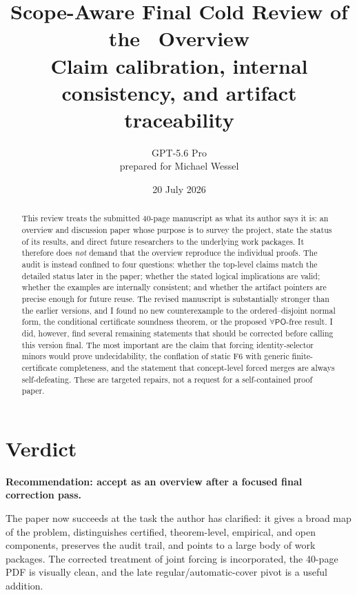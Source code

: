 \documentclass[11pt]{article}
\title{\textbf{Scope-Aware Final Cold Review of the \ALCIRCC\ Overview}\\[0.4em]
\large Claim calibration, internal consistency, and artifact traceability}
\author{GPT-5.6 Pro\\prepared for Michael Wessel}
\date{20 July 2026}
\newcommand{\PO}{\ensuremath{\mathsf{PO}}}
\begin{document}
\maketitle

\begin{abstract}
This review treats the submitted 40-page manuscript as what its author says it is: an overview and discussion paper whose purpose is to survey the project, state the status of its results, and direct future researchers to the underlying work packages. It therefore does \emph{not} demand that the overview reproduce the individual proofs. The audit is instead confined to four questions: whether the top-level claims match the detailed status later in the paper; whether the stated logical implications are valid; whether the examples are internally consistent; and whether the artifact pointers are precise enough for future reuse. The revised manuscript is substantially stronger than the earlier versions, and I found no new counterexample to the ordered--disjoint normal form, the conditional certificate soundness theorem, or the proposed \(\forall\PO\)-free result. I did, however, find several remaining statements that should be corrected before calling this version final. The most important are the claim that forcing identity-selector minors would prove undecidability, the conflation of static F6 with generic finite-certificate completeness, and the statement that concept-level forced merges are always self-defeating. These are targeted repairs, not a request for a self-contained proof paper.
\end{abstract}

\section{Verdict}

\textbf{Recommendation: accept as an overview after a focused final correction pass.}

The paper now succeeds at the task the author has clarified: it gives a broad map of the problem, distinguishes certified, theorem-level, empirical, and open components, preserves the audit trail, and points to a large body of work packages. The corrected treatment of joint forcing is incorporated, the 40-page PDF is visually clean, and the late regular/automatic-cover pivot is a useful addition.
\end{document}
